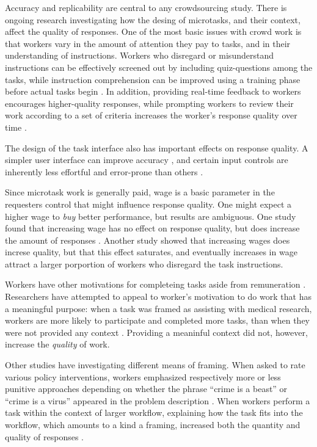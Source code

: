 \documentclass{sigchi}
\begin{document}
Accuracy and replicability are central to any crowdsourcing study.
There is ongoing research investigating how the desing of microtasks,
and their context, affect the quality of responses.  
One of the most basic issues with crowd work
is that workers vary in the amount of attention they pay to tasks, 
and in their understanding of instructions.
Workers who disregard or misunderstand instructions can be effectively 
screened out by including quiz-questions among the tasks, while
instruction comprehension can be improved using a training phase before
actual tasks begin
\cite{le2010ensuring,kazai2013analysis}. %
In addition, providing real-time feedback to workers encourages  
higher-quality responses, while prompting workers to review their work
according to a set of criteria increases the worker's response quality 
over time \cite{Dow20121013}.

The design of the task interface also has important effects on response
quality.  A simpler user interface can improve accuracy 
\cite{Finnerty2013}, and certain input controls
are inherently less effortful and error-prone than others
\cite{cheng2015measuring}.

Since microtask work is generally paid, wage is a basic parameter in
the requesters control that might influence response quality.
One might expect a higher wage to \textit{buy} better performance,
but results are ambiguous.  One study found that increasing wage
has no effect on response quality, but does increase the amount of 
responses \cite{Mason200977}.
Another study \cite{kazai2013analysis} showed that increasing
wages does increse quality, but that this effect saturates, and 
eventually increases in wage attract a larger porportion of workers who 
disregard the task instructions.

Workers have other motivations for completeing tasks aside from 
remuneration \cite{kazai2013analysis}.  
Researchers have attempted to appeal to
worker's motivation to do work that has a meaningful purpose:
when a task was framed as assisting with medical research,
workers are more likely to participate and completed more tasks, than
when they were not provided any context \cite{chandler2013breaking}.
Providing a meaninful context did not, however, increase the 
\textit{quality} of work.

Other studies have investigating different means of framing.  
When asked to rate various policy interventions, 
workers emphasized respectively more or less punitive approaches
depending on whether the phrase ``crime is a beast'' or 
``crime is a virus'' appeared in the problem description
\cite{thibodeau2013natural}.
When workers perform a task within the context of larger workflow, 
explaining how the task fits into the workflow, 
which amounts to a kind a framing, increased both the quantity and 
quality of responses \cite{Kinnaird2012281}.
\end{document}

